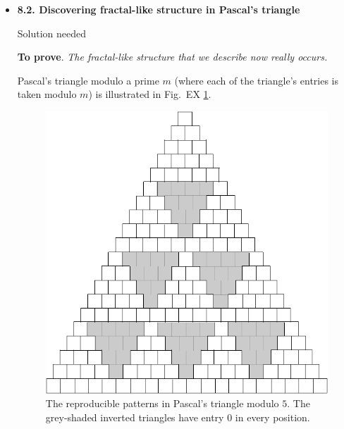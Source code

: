 


\begin{itemize}

\item
{\bf 8.2. Discovering fractal-like structure in Pascal's triangle}

{\Arny Solution needed}

{\bf To prove}.  {\em The fractal-like structure that we describe now really occurs.}

\smallskip

Pascal's triangle modulo a prime $m$ (where each of the triangle's entries is taken modulo $m$) is illustrated in Fig.~EX \ref{fig:TriangleFractal}.

\begin{figure}[ht]
\begin{center}
	\includegraphics[scale=0.3]{FiguresArithmetic/PascalTriangleFractal.png}
	        \caption{The reproducible patterns in Pascal's triangle modulo $5$.
	        The grey-shaded inverted triangles have entry $0$ in every position.}
        \label{fig:TriangleFractal}
\end{center}
\end{figure}


\end{itemize}
